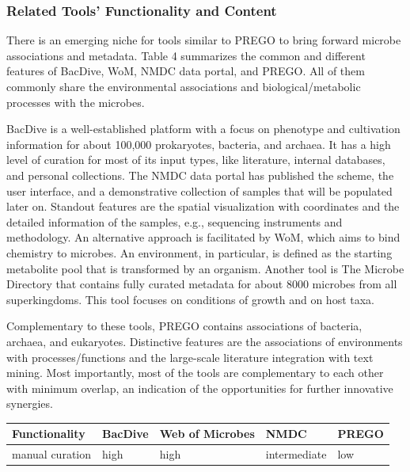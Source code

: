 {   \subsubsection*{Related Tools' Functionality and Content}
   \label{subsec:prego-similar-platforms}

   There is an emerging niche for tools similar to PREGO to bring forward microbe associations and metadata. 
   Table 4 summarizes the common and different features of BacDive, WoM, NMDC data portal, and PREGO. All of them commonly share the environmental associations and biological/metabolic processes with the microbes.

   BacDive is a well-established platform with a focus on phenotype and cultivation information for about 100,000 prokaryotes, bacteria, and archaea. 
   It has a high level of curation for most of its input types, like literature, internal databases, and personal collections. 
   The NMDC data portal has published the scheme, the user interface, and a demonstrative collection of samples that will be populated later on. Standout features are the spatial visualization with coordinates and the detailed information of the samples, e.g., sequencing instruments and methodology. 
   An alternative approach is facilitated by WoM, which aims to bind chemistry to microbes. An environment, in particular, is defined as the starting metabolite pool that is transformed by an organism.
   Another tool is The Microbe Directory that contains fully curated metadata for about 8000 microbes from all superkingdoms. This tool focuses on conditions of growth and on host taxa.

   Complementary to these tools, PREGO contains associations of bacteria, archaea, and eukaryotes. Distinctive features are the associations of environments with processes/functions and the large-scale literature integration with text mining. Most importantly, most of the tools are complementary to each other with minimum overlap, an indication of the opportunities for further innovative synergies.


   \begin{table}[h]

      \begin{adjustwidth}{-0.75cm}{}

      \begin{tabular}{@{}lllll@{}}
      
      \toprule
      Functionality & BacDive & Web of Microbes & NMDC & PREGO \\ \midrule
      manual curation & high & high & intermediate & low \\ 


\end{tabular}
\end{adjustwidth}
\end{table}}
